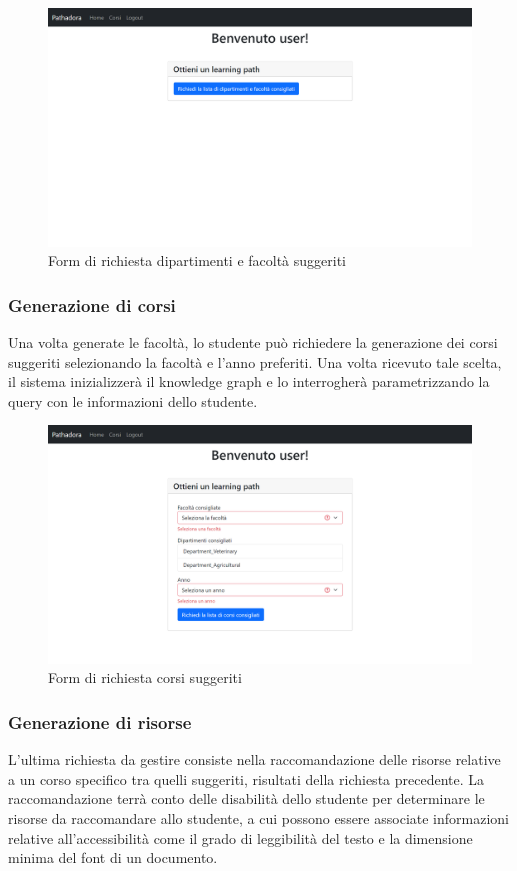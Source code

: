 \begin{figure}[H]
\centering
\includegraphics[scale=0.4]{res/faculties-generation.png}
\caption{Form di richiesta dipartimenti e facoltà suggeriti}
\label{fig:faculties-generation}
\end{figure}

\subsubsection{Generazione di corsi}
Una volta generate le facoltà, lo studente può richiedere la generazione dei corsi suggeriti selezionando la facoltà e l'anno preferiti. 
Una volta ricevuto tale scelta, il sistema inizializzerà il knowledge graph e lo interrogherà parametrizzando la query con le informazioni dello studente.

\begin{figure}[H]
\centering
\includegraphics[scale=0.4]{res/courses-generation.png}
\caption{Form di richiesta corsi suggeriti}
\label{fig:courses-generation}
\end{figure}

\subsubsection{Generazione di risorse}
L'ultima richiesta da gestire consiste nella raccomandazione delle risorse relative a un corso specifico tra quelli suggeriti, risultati della richiesta precedente.
La raccomandazione terrà conto delle disabilità dello studente per determinare le risorse da raccomandare allo studente, a cui possono essere associate informazioni relative all'accessibilità come il grado di leggibilità del testo e la dimensione minima del font di un documento.

